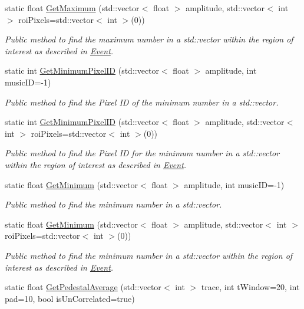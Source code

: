 \begin{DoxyCompactItemize}
static float \hyperlink{classIUtilities_af77a578e3f7924e82545205e3a766bd0}{Get\+Maximum} (std\+::vector$<$ float $>$ amplitude, std\+::vector$<$ int $>$ roi\+Pixels=std\+::vector$<$ int $>$(0))
\begin{DoxyCompactList}\small\item\em Public method to find the maximum number in a std\+::vector within the region of interest as described in \hyperlink{classEvent}{Event}. \end{DoxyCompactList}\item 
static int \hyperlink{classIUtilities_ae7db5eec63bd72ddfd50aa0abbb03a6d}{Get\+Minimum\+Pixel\+ID} (std\+::vector$<$ float $>$ amplitude, int music\+ID=-\/1)
\begin{DoxyCompactList}\small\item\em Public method to find the Pixel ID of the minimum number in a std\+::vector. \end{DoxyCompactList}\item 
static int \hyperlink{classIUtilities_a2e1fadb4432d146d004d747af2ab447b}{Get\+Minimum\+Pixel\+ID} (std\+::vector$<$ float $>$ amplitude, std\+::vector$<$ int $>$ roi\+Pixels=std\+::vector$<$ int $>$(0))
\begin{DoxyCompactList}\small\item\em Public method to find the Pixel ID for the minimum number in a std\+::vector within the region of interest as described in \hyperlink{classEvent}{Event}. \end{DoxyCompactList}\item 
static float \hyperlink{classIUtilities_a9b38571c8548ab538cc65aad6f238fe8}{Get\+Minimum} (std\+::vector$<$ float $>$ amplitude, int music\+ID=-\/1)
\begin{DoxyCompactList}\small\item\em Public method to find the minimum number in a std\+::vector. \end{DoxyCompactList}\item 
static float \hyperlink{classIUtilities_ae3f9e408e055f71e9f08d2c12dec2117}{Get\+Minimum} (std\+::vector$<$ float $>$ amplitude, std\+::vector$<$ int $>$ roi\+Pixels=std\+::vector$<$ int $>$(0))
\begin{DoxyCompactList}\small\item\em Public method to find the minimum number in a std\+::vector within the region of interest as described in \hyperlink{classEvent}{Event}. \end{DoxyCompactList}\item 
static float \hyperlink{classIUtilities_a65527a73c39d6cae81f6a09fb9a44d93}{Get\+Pedestal\+Average} (std\+::vector$<$ int $>$ trace, int t\+Window=20, int pad=10, bool is\+Un\+Correlated=true)

\end{DoxyCompactItemize}
